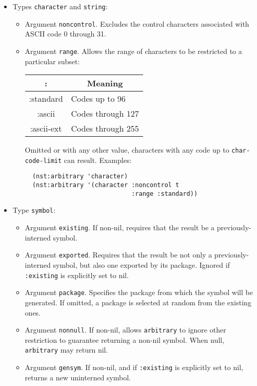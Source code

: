 \begin{itemize}
\item Types \texttt{character} and \texttt{string}:
  \begin{itemize}
  \item Argument \texttt{noncontrol}.  Excludes the control characters
    associated with ASCII code 0 through 31.
  \item Argument \texttt{range}.  Allows the range of characters to be
    restricted to a particular subset:
    \begin{center}
      \begin{tabular}{>{\ttfamily:}c|l}
        \multicolumn{1}{c|}{Value} & \multicolumn{1}{c}{Meaning}
        \\ \hline standard & Codes up to 96
        \\ ascii & Codes through 127
        \\ ascii-ext & Codes through 255
      \end{tabular}
    \end{center}
    Omitted or with any other value, characters with any code up to
    \texttt{char-code-limit} can result.  Examples:
\begin{verbatim}
  (nst:arbitrary 'character)
  (nst:arbitrary '(character :noncontrol t
                             :range :standard))
\end{verbatim}
  \end{itemize}
  
\item Type \texttt{symbol}:
  \begin{itemize}
  \item Argument \texttt{existing}.  If non-nil, requires that the
    result be a previously-interned symbol.
  \item Argument \texttt{exported}.  Requires that the result be not
    only a previously-interned symbol, but also one exported by its
    package.  Ignored if \texttt{:existing} is explicitly set to nil.
  \item Argument \texttt{package}.  Specifies the package from which
    the symbol will be generated.  If omitted, a package is selected
    at random from the existing ones.
  \item Argument \texttt{nonnull}.  If non-nil, allows
    \texttt{arbitrary} to ignore other restriction to guarantee
    returning a non-nil symbol.  When null, \texttt{arbitrary} may
    return nil.
  \item Argument \texttt{gensym}.  If non-nil, and if
    \texttt{:existing} is explicitly set to nil, returns a new
    uninterned symbol.
  \end{itemize}
  

\end{itemize}
